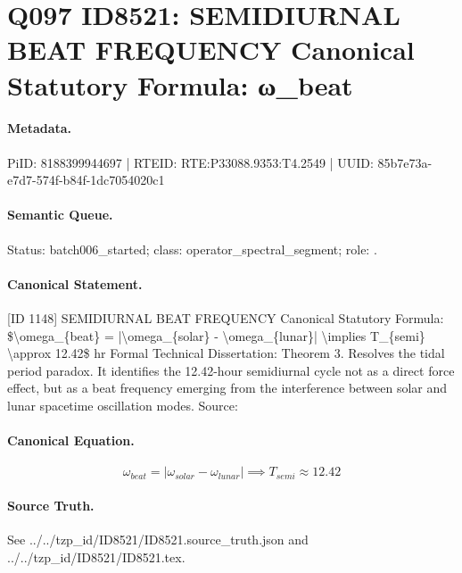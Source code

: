 \section*{Q097 ID8521: SEMIDIURNAL BEAT FREQUENCY Canonical Statutory Formula: ω\_beat}
\paragraph{Metadata.}
PiID: 8188399944697 | RTEID: RTE:P33088.9353:T4.2549 | UUID: 85b7e73a-e7d7-574f-b84f-1dc7054020c1

\paragraph{Semantic Queue.}
Status: batch006\_started; class: operator\_spectral\_segment; role: .

\paragraph{Canonical Statement.}
[ID 1148] SEMIDIURNAL BEAT FREQUENCY Canonical Statutory Formula: \$\textbackslash{}omega\_\{beat\} = |\textbackslash{}omega\_\{solar\} - \textbackslash{}omega\_\{lunar\}| \textbackslash{}implies T\_\{semi\} \textbackslash{}approx 12.42\$ hr Formal Technical Dissertation: Theorem 3. Resolves the tidal period paradox. It identifies the 12.42-hour semidiurnal cycle not as a direct force effect, but as a beat frequency emerging from the interference between solar and lunar spacetime oscillation modes. Source:

\paragraph{Canonical Equation.}
\[
\omega_{beat} = |\omega_{solar} - \omega_{lunar}| \implies T_{semi} \approx 12.42
\]

\paragraph{Source Truth.}
See ../../tzp\_id/ID8521/ID8521.source\_truth.json and ../../tzp\_id/ID8521/ID8521.tex.
